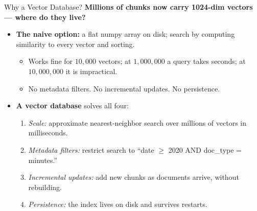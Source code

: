 \begin{frame}{Why a Vector Database?}
\textbf{Millions of chunks now carry 1024-dim vectors --- where do they live?}

\medskip
\begin{itemize}
\item \textbf{The naive option:} a flat numpy array on disk; search by computing similarity to every vector and sorting.
\begin{itemize}
    \item Works fine for $10{,}000$ vectors; at $1{,}000{,}000$ a query takes seconds; at $10{,}000{,}000$ it is impractical.
    \item No metadata filters. No incremental updates. No persistence.
\end{itemize}

\medskip
\item \textbf{A vector database} solves all four:
\begin{enumerate}
    \item \emph{Scale:} approximate nearest-neighbor search over millions of vectors in milliseconds.
    \item \emph{Metadata filters:} restrict search to ``date $\geq$ 2020 AND doc\_type = minutes.''
    \item \emph{Incremental updates:} add new chunks as documents arrive, without rebuilding.
    \item \emph{Persistence:} the index lives on disk and survives restarts.
\end{enumerate}
\end{itemize}
\end{frame}

